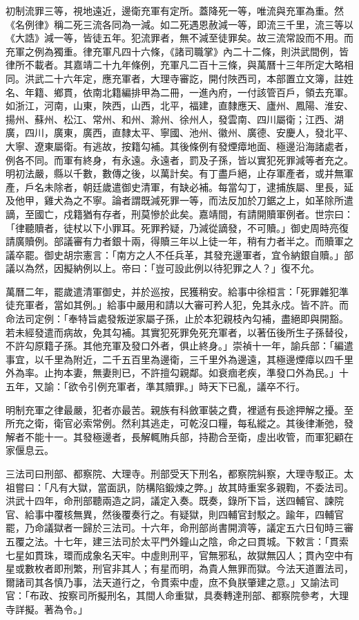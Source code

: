 初制流罪三等，視地遠近，邊衛充軍有定所。蓋降死一等，唯流與充軍為重。然《名例律》稱二死三流各同為一減。如二死遇恩赦減一等，即流三千里，流三等以《大誥》減一等，皆徒五年。犯流罪者，無不減至徒罪矣。故三流常設而不用。而充軍之例為獨重。律充軍凡四十六條，《諸司職掌》內二十二條，則洪武間例，皆律所不載者。其嘉靖二十九年條例，充軍凡二百十三條，與萬曆十三年所定大略相同。洪武二十六年定，應充軍者，大理寺審訖，開付陜西司，本部置立文簿，註姓名、年籍、鄉貫，依南北籍編排甲為二冊，一進內府，一付該管百戶，領去充軍。如浙江，河南，山東，陜西，山西，北平，福建，直隸應天、廬州、鳳陽、淮安、揚州、蘇州、松江、常州、和州、滁州、徐州人，發雲南、四川屬衛；江西、湖廣，四川，廣東，廣西，直隸太平、寧國、池州、徽州、廣德、安慶人，發北平、大寧、遼東屬衛。有逃故，按籍勾補。其後條例有發煙瘴地面、極邊沿海諸處者，例各不同。而軍有終身，有永遠。永遠者，罰及子孫，皆以實犯死罪減等者充之。明初法嚴，縣以千數，數傳之後，以萬計矣。有丁盡戶絕，止存軍產者，或并無軍產，戶名未除者，朝廷歲遣御史清軍，有缺必補。每當勾丁，逮捕族屬、里長，延及他甲，雞犬為之不寧。論者謂既減死罪一等，而法反加於刀鋸之上，如革除所遣謫，至國亡，戍籍猶有存者，刑莫慘於此矣。嘉靖間，有請開贖軍例者。世宗曰：「律聽贖者，徒杖以下小罪耳。死罪矜疑，乃減從謫發，不可贖。」御史周時亮復請廣贖例。部議審有力者銀十兩，得贖三年以上徒一年，稍有力者半之。而贖軍之議卒罷。御史胡宗憲言：「南方之人不任兵革，其發充邊軍者，宜令納銀自贖。」部議以為然，因擬納例以上。帝曰：「豈可設此例以待犯罪之人？」復不允。

萬曆二年，罷歲遣清軍御史，并於巡按，民獲稍安。給事中徐桓言：「死罪雜犯準徒充軍者，當如其例。」給事中嚴用和請以大審可矜人犯，免其永戍。皆不許。而命法司定例：「奉特旨處發叛逆家屬子孫，止於本犯親枝內勾補，盡絕即與開豁。若未經發遣而病故，免其勾補。其實犯死罪免死充軍者，以著伍後所生子孫替役，不許勾原籍子孫。其他充軍及發口外者，俱止終身。」崇禎十一年，諭兵部：「編遣事宜，以千里為附近，二千五百里為邊衛，三千里外為邊遠，其極邊煙瘴以四千里外為率。止拘本妻，無妻則已，不許擅勾親鄰。如衰痼老疾，準發口外為民。」十五年，又諭：「欲令引例充軍者，準其贖罪。」時天下已亂，議卒不行。

明制充軍之律最嚴，犯者亦最苦。親族有科斂軍裝之費，裡遞有長途押解之擾。至所充之衛，衛官必索常例。然利其逃走，可乾沒口糧，每私縱之。其後律漸弛，發解者不能十一。其發極邊者，長解輒賄兵部，持勘合至衛，虛出收管，而軍犯顧在家偃息云。


三法司曰刑部、都察院、大理寺。刑部受天下刑名，都察院糾察，大理寺駁正。太祖嘗曰：「凡有大獄，當面訊，防構陷鍛煉之弊。」故其時重案多親鞫，不委法司。洪武十四年，命刑部聽兩造之詞，議定入奏。既奏，錄所下旨，送四輔官、諫院官、給事中覆核無異，然後覆奏行之。有疑獄，則四輔官封駁之。踰年，四輔官罷，乃命議獄者一歸於三法司。十六年，命刑部尚書開濟等，議定五六日旬時三審五覆之法。十七年，建三法司於太平門外鐘山之陰，命之曰貫城。下敕言：「貫索七星如貫珠，環而成象名天牢。中虛則刑平，官無邪私，故獄無囚人；貫內空中有星或數枚者即刑繁，刑官非其人；有星而明，為貴人無罪而獄。今法天道置法司，爾諸司其各慎乃事，法天道行之，令貫索中虛，庶不負朕肇建之意。」又諭法司官：「布政、按察司所擬刑名，其間人命重獄，具奏轉達刑部、都察院參考，大理寺詳擬。著為令。」

